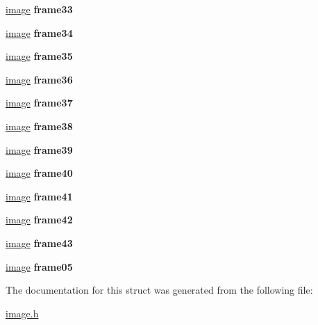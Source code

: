 \begin{DoxyCompactItemize}
\hyperlink{structimage}{image} {\bfseries frame33}
\item 
\mbox{\label{structanimation_a7dc50adcc3c81ac6e80fd4dea5323727}} 
\hyperlink{structimage}{image} {\bfseries frame34}
\item 
\mbox{\label{structanimation_a44ecb3696f291dec2dcaf55cf8d2b076}} 
\hyperlink{structimage}{image} {\bfseries frame35}
\item 
\mbox{\label{structanimation_a4e781221d69bb6f01f8aa5a0aa644ee4}} 
\hyperlink{structimage}{image} {\bfseries frame36}
\item 
\mbox{\label{structanimation_acae60fa9949a04b0ae6378f62d8ccbc6}} 
\hyperlink{structimage}{image} {\bfseries frame37}
\item 
\mbox{\label{structanimation_a12d20c8dc29b8cd3e2584e5d67d9b4ea}} 
\hyperlink{structimage}{image} {\bfseries frame38}
\item 
\mbox{\label{structanimation_a32f66455d8b2ac46ed6f3d708f64bab2}} 
\hyperlink{structimage}{image} {\bfseries frame39}
\item 
\mbox{\label{structanimation_ab19ef60d615fedf265a56c4d05b4eda6}} 
\hyperlink{structimage}{image} {\bfseries frame40}
\item 
\mbox{\label{structanimation_a5dbb367fdd74534f340caac38f9f674f}} 
\hyperlink{structimage}{image} {\bfseries frame41}
\item 
\mbox{\label{structanimation_aeb47edc21048c4da413b5e1811f26a3d}} 
\hyperlink{structimage}{image} {\bfseries frame42}
\item 
\mbox{\label{structanimation_a1f6a463139fb2cd4fa86dc7ac6439311}} 
\hyperlink{structimage}{image} {\bfseries frame43}
\item 
\mbox{\label{structanimation_ad70a997b1813eeac7487690033cabf0f}} 
\hyperlink{structimage}{image} {\bfseries frame05}
\end{DoxyCompactItemize}


The documentation for this struct was generated from the following file\+:\begin{DoxyCompactItemize}
\item 
\hyperlink{image_8h}{image.\+h}\end{DoxyCompactItemize}
